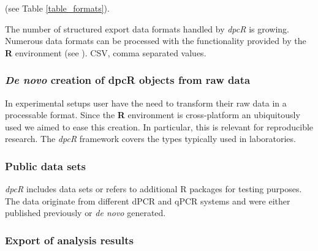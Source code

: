 \documentclass[a4,center,fleqn]{NAR}
\begin{document}
(see Table \ref{table_formats}).

\begin{table}[b]
 {The number of structured export data formats handled by \textit{dpcR} is 
growing. Numerous data formats can be processed with the functionality provided 
by the \textbf{R} environment (see \cite{rodiger_r_2015}). CSV, comma separated 
values.}
\end{table}

\subsubsection{\textit{De novo} creation of dpcR objects from raw data}

In experimental setups user have the need to transform their raw data in a 
processable format. Since the \textbf{R} environment is cross-platform an 
ubiquitously used we aimed to ease this creation. In particular, this is 
relevant for reproducible research. The \textit{dpcR} framework covers the types 
typically used in laboratories.

\subsubsection{Public data sets}

\textit{dpcR} includes data sets or refers to additional R packages for testing 
purposes. The data originate from different dPCR and qPCR systems and were 
either published previously \cite{whale_comparison_2012, roediger2015chippcr, 
white_digital_2009, rodiger_r_2015} or \textit{de novo} generated.

\subsubsection{Export of analysis results}
\end{document}

